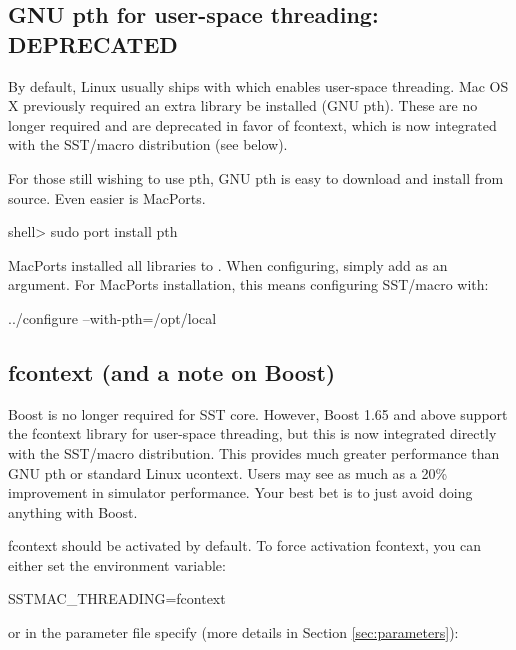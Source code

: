 
\subsection{GNU pth for user-space threading: DEPRECATED}\label{subsubsec:pth}
By default, Linux usually ships with  which enables user-space threading.
Mac OS X previously required an extra library be installed (GNU pth).
These are no longer required and are deprecated in favor of fcontext,
which is now integrated with the SST/macro distribution (see below).

For those still wishing to use pth, GNU pth is easy to download and install from source.
Even easier is MacPorts. 

\begin{ShellCmd}
shell> sudo port install pth
\end{ShellCmd}

MacPorts installed all libraries to . 
When configuring, simply add  as an argument.
For MacPorts installation, this means configuring SST/macro with:

\begin{ShellCmd}
../configure --with-pth=/opt/local
\end{ShellCmd}

\subsection{fcontext (and a note on Boost)}\label{subsubsec:boost}
Boost is no longer required for SST core.
However, Boost 1.65 and above support the fcontext library for user-space threading,
but this is now integrated directly with the SST/macro distribution.
This provides much greater performance than GNU pth or standard Linux ucontext.
Users may see as much as a 20\% improvement in simulator performance.
Your best bet is to just avoid doing anything with Boost.

fcontext should be activated by default. To force activation fcontext, you can either set the environment variable:

\begin{ShellCmd}
SSTMAC_THREADING=fcontext
\end{ShellCmd}
or in the parameter file specify (more details in Section \ref{sec:parameters}):

